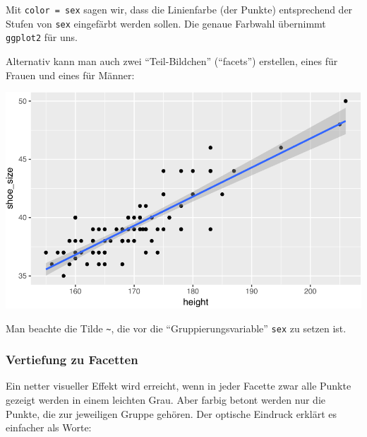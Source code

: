 \documentclass[12pt,ngerman,]{book}
\newenvironment{Shaded}{\begin{snugshade}}{\end{snugshade}}
\newcommand{\KeywordTok}[1]{\textcolor[rgb]{0.13,0.29,0.53}{\textbf{{#1}}}}
\newcommand{\DataTypeTok}[1]{\textcolor[rgb]{0.13,0.29,0.53}{{#1}}}
\newcommand{\DecValTok}[1]{\textcolor[rgb]{0.00,0.00,0.81}{{#1}}}
\newcommand{\StringTok}[1]{\textcolor[rgb]{0.31,0.60,0.02}{{#1}}}
\newcommand{\NormalTok}[1]{{#1}}
\renewenvironment{Shaded}{\begin{kframe}}{\end{kframe}}
\begin{document}
Mit \texttt{color\ =\ sex} sagen wir, dass die Linienfarbe (der Punkte)
entsprechend der Stufen von \texttt{sex} eingefärbt werden sollen. Die
genaue Farbwahl übernimmt \texttt{ggplot2} für uns.

Alternativ kann man auch zwei ``Teil-Bildchen'' (``facets'') erstellen,
eines für Frauen und eines für Männer:

\begin{Shaded}
\end{Shaded}

\begin{center}\includegraphics[width=0.7\linewidth]{050_Daten_visualisieren_files/figure-latex/unnamed-chunk-16-1} \end{center}

Man beachte die Tilde \texttt{\textasciitilde{}}, die vor die
``Gruppierungsvariable'' \texttt{sex} zu setzen ist.

\subsubsection{Vertiefung zu Facetten}\label{vertiefung-zu-facetten}

Ein netter visueller Effekt wird erreicht, wenn in jeder Facette zwar
alle Punkte gezeigt werden in einem leichten Grau. Aber farbig betont
werden nur die Punkte, die zur jeweiligen Gruppe gehören. Der optische
Eindruck erklärt es einfacher als Worte:
\end{document}
